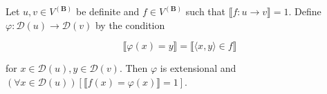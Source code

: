 Let $u, v \in V^{(\mathbf{B})}$ be definite and $f \in V^{(\mathbf{B})}$ such that $\llbracket f: u \rightarrow v \rrbracket = 1$. Define $\varphi: \mathcal{D}(u) \rightarrow \mathcal{D}(v)$ by the condition

$$\llbracket \varphi(x) = y \rrbracket = \llbracket \langle x, y \rangle \in f \rrbracket$$

for $x \in \mathcal{D}(u), y \in \mathcal{D}(v)$. Then $\varphi$ is extensional and $(\forall x \in \mathcal{D}(u))[\llbracket f(x) = \varphi(x) \rrbracket = 1]$.
